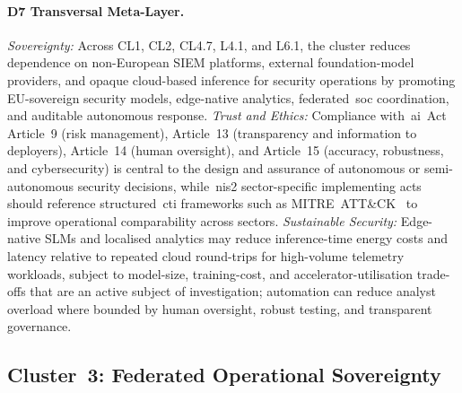 \documentclass{ieeeaccess}
\begin{document}
\paragraph{D7 Transversal Meta-Layer.}
\emph{Sovereignty:} Across CL1, CL2, CL4.7, L4.1, and L6.1, the cluster reduces dependence on non-European SIEM platforms, external foundation-model providers, and opaque cloud-based inference for security operations by promoting EU-sovereign security models, edge-native analytics, federated~\gls{soc} coordination, and auditable autonomous response. \emph{Trust and Ethics:} Compliance with~\gls{ai}~Act Article~9 (risk management), Article~13 (transparency and information to deployers), Article~14 (human oversight), and Article~15 (accuracy, robustness, and cybersecurity) is central to the design and assurance of autonomous or semi-autonomous security decisions, while~\gls{nis2} sector-specific implementing acts should reference structured~\gls{cti} frameworks such as MITRE~ATT\&CK~\cite{mitre2020} to improve operational comparability across sectors. \emph{Sustainable Security:} Edge-native SLMs and localised analytics may reduce inference-time energy costs and latency relative to repeated cloud round-trips for high-volume telemetry workloads, subject to model-size, training-cost, and accelerator-utilisation trade-offs that are an active subject of investigation; automation can reduce analyst overload where bounded by human oversight, robust testing, and transparent governance.

\subsection{Cluster~3: Federated Operational Sovereignty}
\label{subsec:c3}
\end{document}
